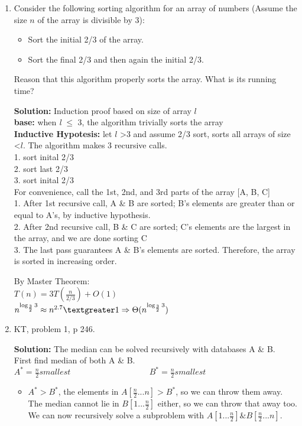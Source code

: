 \documentclass[11pt]{article}
\begin{document}
\begin{enumerate}
\item Consider the following sorting algorithm for an array of numbers (Assume the size $n$ of the array is divisible by $3$):
\begin{itemize}
\item   Sort the initial 2/3 of the array.
\item   Sort the final 2/3 and then again the initial 2/3.
\end{itemize}

Reason that this algorithm properly sorts the array. What is its running time?

\textbf{Solution:}
Induction proof based on size of array $l$\\
\textbf{base:} when \emph{l} $\leq$ 3, the algorithm trivially sorts the array\\
\textbf{Inductive Hypotesis:} let $l$ \textgreater $3$ and assume 2/3 sort, sorts all arrays of size \textless $l$. The algorithm makes $3$ recursive calls.\\

1. sort inital 2/3\\
2. sort last 2/3\\
3. sort inital 2/3\\

For convenience, call the 1st, 2nd, and 3rd parts of the array [A, B, C]\\

1. After 1st recursive call, A \& B are sorted; B's elements are greater than or equal to A's, by inductive hypothesis.\\
2. After 2nd recursive call, B \& C are sorted; C's elements are the largest in the array, and we are done sorting C\\
3. The last pass guarantees A \& B's elements are sorted. Therefore, the array is sorted in increasing order.

By Master Theorem:\\
$T(n) = 3T(\frac{n}{2/3}) + O(1)$\\
$n^{\log_\frac{3}{2} 3} \approx n^{2.7} \textgreater 1 \Rightarrow \Theta(n^{\log_\frac{3}{2} 3})$

\vspace*{.2cm}

\item KT, problem 1, p 246.

\vspace*{.2cm}
\textbf{Solution:}
The median can be solved recursively with databases A \& B.\\
First find median of both A \& B.\\
$A^* = \frac{n}{2} smallest \hspace{4cm} B^* = \frac{n}{2} smallest$
\begin{itemize}
\item $A^* > B^*$, the elements in $A[\frac{n}{2}...n] > B^*$, so we can throw them away. The median cannot lie in $B[1...\frac{n}{2}]$ either, so we can throw that away too. We can now recursively solve a subproblem with $A[1...\frac{n}{2}] \& B[\frac{n}{2}...n].$


\end{itemize}
\end{enumerate}
\end{document}
